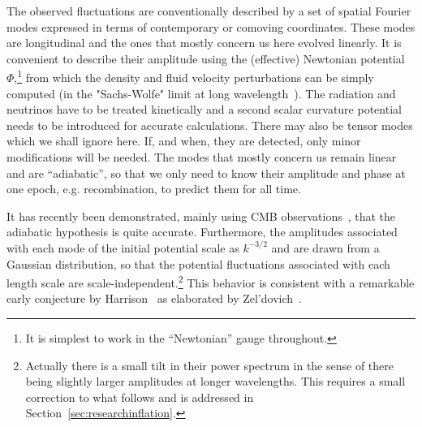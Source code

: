 \documentclass[psfig,11pt]{article}
\begin{document}
The observed fluctuations are conventionally described by a set of spatial Fourier modes expressed in terms of contemporary or comoving coordinates. These modes are longitudinal and the ones that mostly concern us here evolved linearly. It is convenient to describe their amplitude using the (effective) Newtonian potential $\Phi$,\footnote{It is simplest to work in the ``Newtonian'' gauge throughout.} from which the density and fluid velocity perturbations can be simply computed (in the "Sachs-Wolfe" limit at long wavelength~\cite{Sachs1967}). The radiation and neutrinos have to be treated kinetically and a second scalar curvature potential needs to be introduced for accurate calculations. There may also be tensor modes which we shall ignore here. If, and when, they are detected, only minor modifications will be needed. The modes that mostly concern us remain linear and are ``adiabatic'', so that we only need to know their amplitude and phase at one epoch, e.g. recombination, to predict them for all time.

It has recently been demonstrated, mainly using CMB observations~\cite{Planck2015cosmopara}, that the adiabatic hypothesis is quite accurate. Furthermore, the amplitudes associated with each mode of the initial potential scale as $k^{-3/2}$ and are drawn from a Gaussian distribution, so that the potential fluctuations associated with each length scale are scale-independent.\footnote{Actually there is a small tilt in their power spectrum in the sense of there being slightly larger amplitudes at longer wavelengths. This requires a small correction to what follows and is addressed in Section~\ref{sec:researchinflation}.} This behavior is consistent with a remarkable early conjecture by Harrison~\cite{Harrison1970} as elaborated by Zel'dovich~\cite{Zeldovich1972}.
\end{document}
